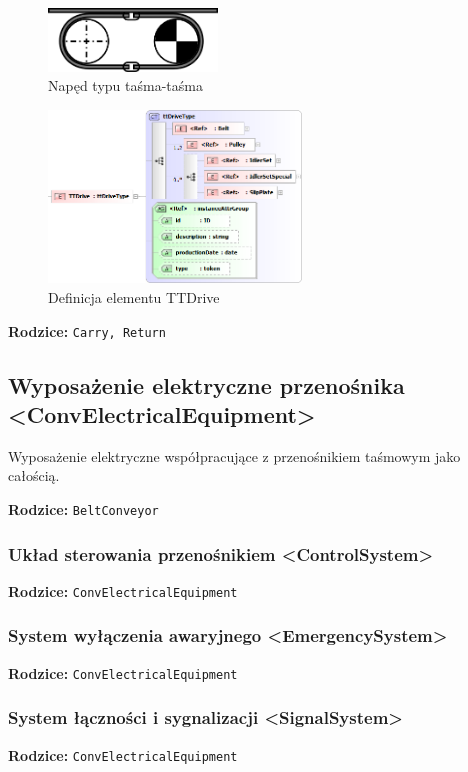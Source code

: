 \documentclass[12pt,a4paper]{article}
\begin{document}
\begin{figure}[H]
  \centering
  \includegraphics[width=0.4\textwidth]{png/naped_tt}
  \caption{Napęd typu taśma-taśma}
  \label{fig:ttDrive-drw}
\end{figure}

\begin{figure}[H]
  \centering
  \includegraphics[width=0.6\textwidth]{png/liquid/TTDrive}
  \caption{Definicja elementu TTDrive}
  \label{fig:ttDrive-xsd}
\end{figure}

\noindent\textbf{Rodzice:} \texttt{Carry, Return}


\subsection{Wyposażenie elektryczne przenośnika <ConvElectricalEquipment>}
Wyposażenie elektryczne współpracujące z przenośnikiem taśmowym jako całością.

\noindent\textbf{Rodzice:} \texttt{BeltConveyor}


\subsubsection{Układ sterowania przenośnikiem <ControlSystem>}
\noindent\textbf{Rodzice:} \texttt{ConvElectricalEquipment}

\subsubsection{System wyłączenia awaryjnego <EmergencySystem>}
\noindent\textbf{Rodzice:} \texttt{ConvElectricalEquipment}

\subsubsection{System łączności i sygnalizacji <SignalSystem>}
\noindent\textbf{Rodzice:} \texttt{ConvElectricalEquipment}
\end{document}

